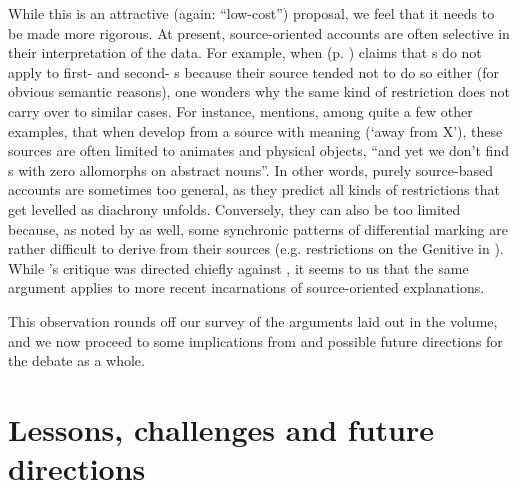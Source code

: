 \documentclass[output=paper]{langsci/langscibook}
\begin{document}
While this is an attractive (again: “low-cost”) proposal, we feel that it needs to be made more rigorous. At present, source-oriented accounts are often selective in their interpretation of the data. For example, when  (p. \pageref{p:cristofaro:ergatives}) claims that s do not apply to first- and second- s because their  source tended not to do so either (for obvious semantic reasons), one wonders why the same kind of restriction does not carry over to similar cases. For instance, \citet[36]{Kiparsky2008} mentions, among quite a few other examples, that when  develop from a source with  meaning (‘away from X’), these sources are often limited to animates and physical objects, “and yet we don't find s with zero allomorphs on abstract nouns”. In other words, purely source-based accounts are sometimes too general, as they predict all kinds of restrictions that get levelled as diachrony unfolds. Conversely, they can also be too limited because, as noted by \citet{Kiparsky2008} as well, some synchronic patterns of differential marking are rather difficult to derive from their sources (e.g.  restrictions on the Genitive in ). While ’s critique was directed chiefly against \citet{Garrett1990}, it seems to us that the same argument applies to more recent incarnations of source-oriented explanations.

This observation rounds off our survey of the arguments laid out in the volume, and we now proceed to some implications from and possible future directions for the debate as a whole.

\section{Lessons, challenges and future directions}\label{sec:epilogue:2}
\end{document}
